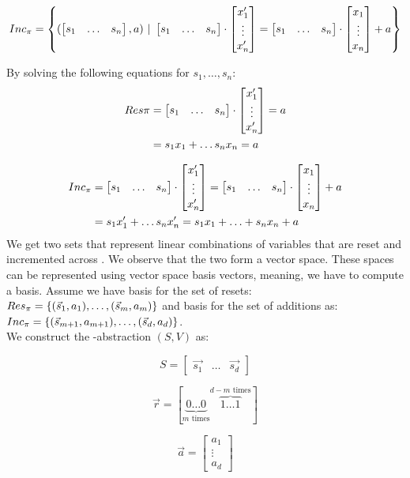 \begin{equation*}
	Inc_\pi = \left\{(\begin{bmatrix} s_1 & \ldots &s_n \end{bmatrix}, a)\ |\ \begin{bmatrix} s_1 & \ldots &s_n \end{bmatrix} \cdot \begin{bmatrix} x_1' \\ \vdots \\ x_n' \end{bmatrix} = \begin{bmatrix} s_1 & \ldots &s_n \end{bmatrix} \cdot \begin{bmatrix} x_1 \\ \vdots \\ x_n \end{bmatrix} + a\right\}	
\end{equation*}
\begin{comment}
	\begin{equation*}
	Res_H = \left\{ (\s, a) | H \models \s \cdot \p = a \right\}	
	\end{equation*}
	
	\begin{equation*}
	Inc_H = \left\{(\s, a) | H \models \s \cdot \p = \s \cdot \up + a\right\}	
	\end{equation*}
\end{comment}
By solving the following equations for $s_1, \ldots, s_n$: \\
\begin{align*}
	Res\pi &= \begin{bmatrix} s_1 & \ldots &s_n \end{bmatrix} \cdot \begin{bmatrix} x_1' \\ \vdots \\ x_n' \end{bmatrix} = a \\
 			&= s_1x_1 + \ldots s_nx_n = a
\end{align*}

\begin{align*}
	Inc_\trf &= \sn \cdot \pn = \sn \cdot \upn + a  \\ \vspace{0.5cm}
			 &= s_1x_1' + \ldots s_nx_n' = s_1x_1 + \ldots + s_nx_n + a
\end{align*}
We get two sets that represent linear combinations of variables that are reset and incremented across \trf. We observe that the two form a vector space. These spaces can be represented using vector space basis vectors, meaning, we have to compute a basis. Assume we have basis for the set of resets:
$Res_\pi = \{(\vec{s}_1, a_1), \ldots, (\vec{s}_m, a_m)\}$ and basis for the set of additions as: $Inc_\pi = \{(\vec{s}_{m+1}, a_{m+1}), \ldots, (\vec{s}_d, a_d)\}$. \\ We construct the \qvasr-abstraction $(S, V)$ as: \\
\begin{center}
\begin{minipage}{0.3\linewidth}
	\begin{equation*}
		S = \begin{bmatrix} \vec{s_1} & \ldots & \vec{s_d} \end{bmatrix}
	\end{equation*}
\end{minipage}
\begin{minipage}{0.3\linewidth}
	\begin{equation*}
		\vec{r} = [ \underbrace{0 \ldots 0}_{m\text{ times}} \overbrace{1 \ldots 1}^{d - m \text{ times}} ]
	\end{equation*}
\end{minipage}
\begin{minipage}{0.3\linewidth}
	\begin{equation*}
		\vec{a} = \begin{bmatrix} a_1 \\ \vdots \\ a_d \end{bmatrix}
	\end{equation*}
\end{minipage}
\end{center}

